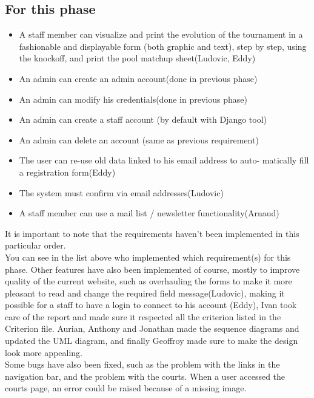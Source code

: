 \documentclass[a4paper, 12pt]{article}
\begin{document}
\subsection{For this phase}
	
\begin{itemize}
 
\item A staff member can visualize and print the evolution of the tournament in a fashionable and displayable form (both graphic and text), step by step, using the knockoff, and print the pool matchup sheet(Ludovic, Eddy)
\item An admin can create an admin account(done in previous phase)
\item An admin can modify his credentials(done in previous phase)
\item An admin can create a staff account (by default with Django tool)
\item An admin can delete an account (same as previous requirement)
\item The user can re-use old data linked to his email address to auto- matically fill a registration form(Eddy)
\item The system must confirm via email addresses(Ludovic)
\item A staff member can use a mail list / newsletter functionality(Arnaud)
\\
\end{itemize}

It is important to note that the requirements haven't been implemented in this particular order.\\

You can see in the list above who implemented which requirement(s) for this phase. Other features have also been implemented of course, mostly to improve quality of the current website, such as overhauling the forms to make it more pleasant to read and change the required field message(Ludovic), making it possible for a staff to have a login to connect to his account (Eddy), Ivan took care of the report and made sure it respected all the criterion listed in the Criterion file. Aurian, Anthony and Jonathan made the sequence diagrams and updated the UML diagram, and finally Geoffroy made sure to make the design look more appealing.\\

Some bugs have also been fixed, such as the problem with the links in the navigation bar, and the problem with the courts. When a user accessed the courts page, an error could be raised because of a missing image. 
\end{document}
